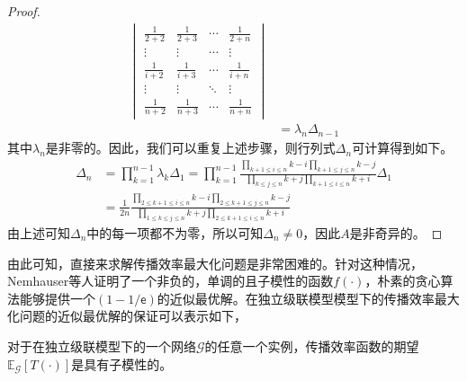 \begin{proof}
\begin{equation}
\begin{split}
    \begin{vmatrix}
    \frac{1}{2+2} & \frac{1}{2+3} & \cdots & \frac{1}{2+n}\\
    \vdots & \vdots & \cdots & \vdots \\
    \frac{1}{i+2} & \frac{1}{i+3} & \cdots & \frac{1}{i+n}\\
    \vdots & \vdots & \ddots & \vdots \\
    \frac{1}{n+2} & \frac{1}{n+3} & \cdots & \frac{1}{n+n}
    \end{vmatrix}\\ 
    &= \lambda_{n} \Delta_{n-1}
\end{split}
\end{equation}
其中$\lambda_{n}$是非零的。因此，我们可以重复上述步骤，则行列式$\Delta_n$可计算得到如下。
\begin{equation}\label{eq:detetminant4}
\begin{split}
    \Delta_n &= \prod\limits_{k=1}^{n-1}{\lambda_k}\Delta_1=\prod\limits_{k=1}^{n-1}{\frac{\prod\limits_{k+1 \leq i \leq n}{k-i}\prod\limits_{k+1 \leq j \leq n}{k-j}}{\prod\limits_{k \leq j \leq n}{k+j}\prod\limits_{k+1 \leq i \leq n}{k+i}}}\Delta_1\\
    & = \frac{1}{2n}\frac{\prod\limits_{2\leq k+1\leq i \leq n}{k-i}\prod\limits_{2\leq k+1\leq j \leq n}{k-j}}{\prod\limits_{1\leq k\leq j \leq n}{k+j}\prod\limits_{2\leq k+1\leq i \leq n}{k+i}}
\end{split}
\end{equation}
由上述可知$\Delta_n$中的每一项都不为零，所以可知$\Delta_n \neq 0$，因此$A$是非奇异的。
\end{proof}

由此可知，直接来求解传播效率最大化问题是非常困难的。针对这种情况，Nemhauser等人证明了一个非负的，单调的且子模性的函数$f(\cdot)$，朴素的贪心算法能够提供一个$(1-1/\textsf{e})$的近似最优解。在独立级联模型模型下的传播效率最大化问题的近似最优解的保证可以表示如下，
\begin{mytheo}\label{theo:submodular}
对于在独立级联模型下的一个网络$\mathcal{G}$的任意一个实例，传播效率函数的期望$\mathbb{E}_\mathcal{G}\left[T\left(\cdot\right)\right]$是具有子模性的。
\end{mytheo}

